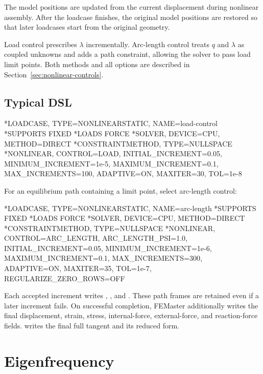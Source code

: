 The model positions are updated from the current displacement during nonlinear assembly. After the loadcase finishes, the original model positions are restored so that later loadcases start from the original geometry.

Load control prescribes \(\lambda\) incrementally. Arc-length control treats \(q\) and \(\lambda\) as coupled unknowns and adds a path constraint, allowing the solver to pass load limit points. Both methods and all  options are described in Section~\ref{sec:nonlinear-controls}.

\subsection{Typical DSL}

\begin{exampledeck}
*LOADCASE, TYPE=NONLINEARSTATIC, NAME=load-control
  *SUPPORTS
  FIXED
  *LOADS
  FORCE
  *SOLVER, DEVICE=CPU, METHOD=DIRECT
  *CONSTRAINTMETHOD, TYPE=NULLSPACE
  *NONLINEAR, CONTROL=LOAD, INITIAL_INCREMENT=0.05, MINIMUM_INCREMENT=1e-5, MAXIMUM_INCREMENT=0.1, MAX_INCREMENTS=100, ADAPTIVE=ON, MAXITER=30, TOL=1e-8
\end{exampledeck}

For an equilibrium path containing a limit point, select arc-length control:

\begin{exampledeck}
*LOADCASE, TYPE=NONLINEARSTATIC, NAME=arc-length
  *SUPPORTS
  FIXED
  *LOADS
  FORCE
  *SOLVER, DEVICE=CPU, METHOD=DIRECT
  *CONSTRAINTMETHOD, TYPE=NULLSPACE
  *NONLINEAR, CONTROL=ARC_LENGTH, ARC_LENGTH_PSI=1.0, INITIAL_INCREMENT=0.05, MINIMUM_INCREMENT=1e-6, MAXIMUM_INCREMENT=0.1, MAX_INCREMENTS=300, ADAPTIVE=ON, MAXITER=35, TOL=1e-7, REGULARIZE_ZERO_ROWS=OFF
\end{exampledeck}

Each accepted increment writes , , and . These path frames are retained even if a later increment fails. On successful completion, FEMaster additionally writes the final displacement, strain, stress, internal-force, external-force, and reaction-force fields.  writes the final full tangent and its reduced form.

\section{Eigenfrequency}
\label{sec:loadcase-eigenfrequency}

